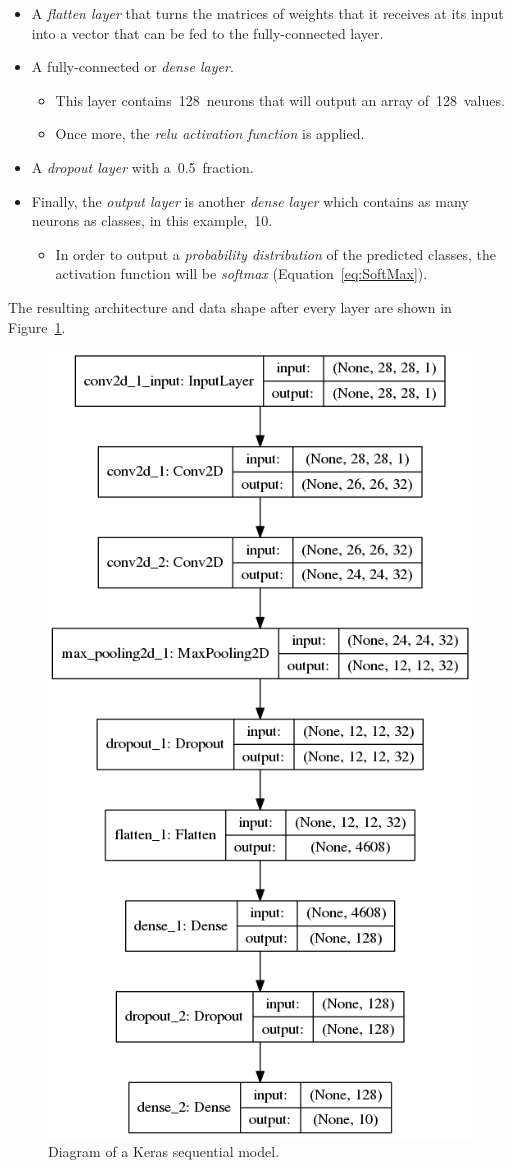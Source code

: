 \begin{itemize}
	\item A \emph{flatten layer} that turns the matrices of weights that it receives at its input into a vector that can be fed to the fully-connected layer.
	\item A fully-connected or \emph{dense layer}.
	\begin{itemize}
		\item This layer contains~128~neurons that will output an array of~128~values.
		\item Once more, the \emph{\gls{relu} activation function} is applied.
	\end{itemize} 
	
	\item A \emph{dropout layer} with a~0.5~fraction.
	
	\item Finally, the \emph{output layer} is another \emph{dense layer} which contains as many neurons as classes, in this example,~10. 
	\begin{itemize}
		\item In order to output a \emph{probability distribution} of the predicted classes, the activation function will be \emph{softmax} (Equation~\ref{eq:SoftMax}).
	\end{itemize}
\end{itemize}

The resulting architecture and data shape after every layer are shown in Figure~\ref{fig:model}.

\begin{figure}
	\centering
	\includegraphics[width=0.6\linewidth, keepaspectratio]{figures/model.png}
	\caption{Diagram of a Keras sequential model.}
	\label{fig:model}
\end{figure}

